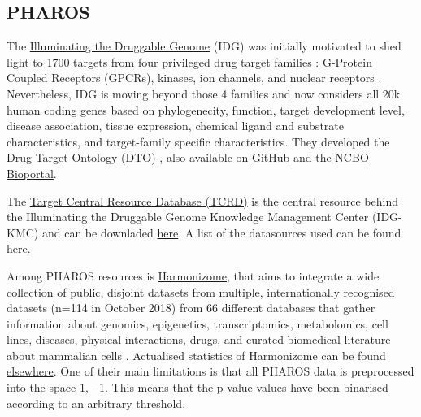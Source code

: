 \subsection{PHAROS}
\label{subsec:pharos}

The \href{https://druggablegenome.net/}{Illuminating the Druggable Genome} (IDG) was initially motivated to shed light to 1700 targets from four privileged drug target families \cite{santos2016}: G-Protein Coupled Receptors (GPCRs), kinases, ion channels, and nuclear receptors \cite{pharos2016}. Nevertheless, IDG is moving beyond those 4 families and now considers all 20k human coding genes \cite{pharos2016} based on phylogenecity, function, target development level, disease association, tissue expression, chemical ligand and substrate characteristics, and target-family specific characteristics. They developed the \href{http://drugtargetontology.org}{Drug Target Ontology (DTO)} \cite{lin2017}, also available on \href{http://github.com/DrugTargetOntology/DTO}{GitHub} and the \href{http://bioportal.bioontology.org/ontologies/DTO}{NCBO Bioportal}.

The \href{http://juniper.health.unm.edu/tcrd/}{Target Central Resource Database (TCRD)} is the central resource behind the Illuminating the Druggable Genome Knowledge Management Center (IDG-KMC) and can be downladed  \href{http://juniper.health.unm.edu/tcrd/download/}{here}. A list of the datasources used can be found \href{http://targetcentral.ws/Pharos}{here}.

Among PHAROS resources is \href{http://amp.pharm.mssm.edu/Harmonizome/about}{Harmonizome}, that aims to integrate a wide collection of public, disjoint datasets from multiple, internationally recognised datasets (n=114 in October 2018) from 66 different databases that gather information about genomics, epigenetics, transcriptomics, metabolomics, cell lines, diseases, physical interactions, drugs, and curated biomedical literature about mammalian cells \cite{harmonizome2016}. Actualised statistics of Harmonizome can be found \href{http://amp.pharm.mssm.edu/Harmonizome/about}{elsewhere}. One of their main limitations is that all PHAROS data is preprocessed into the space ${1,-1}$. This means that the p-value values have been binarised according to an arbitrary threshold.
